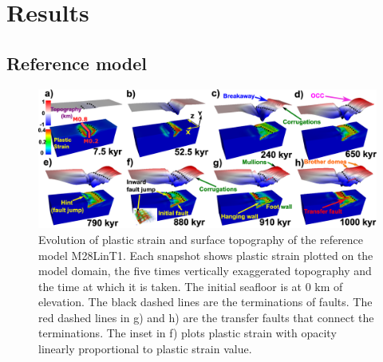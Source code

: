 \pagebreak
\section{Results}

\subsection{Reference model}\label{sec_M28LinT1}

\begin{figure}[h]
  \centering
    \includegraphics[width=1.0\textwidth]{./Figures/fig_Results_1_reference_model.eps}
  \caption{Evolution of plastic strain and surface topography of the reference model M28LinT1. Each snapshot shows plastic strain plotted on the model domain, the five times vertically exaggerated topography and the time at which it is taken. The initial seafloor is at 0 km of elevation. The black dashed lines are the terminations of faults. The red dashed lines in g) and h) are the transfer faults that connect the terminations. The inset in f) plots plastic strain with opacity linearly proportional to plastic strain value.}%
 \label{fig_Results1_1}
\end{figure}   

